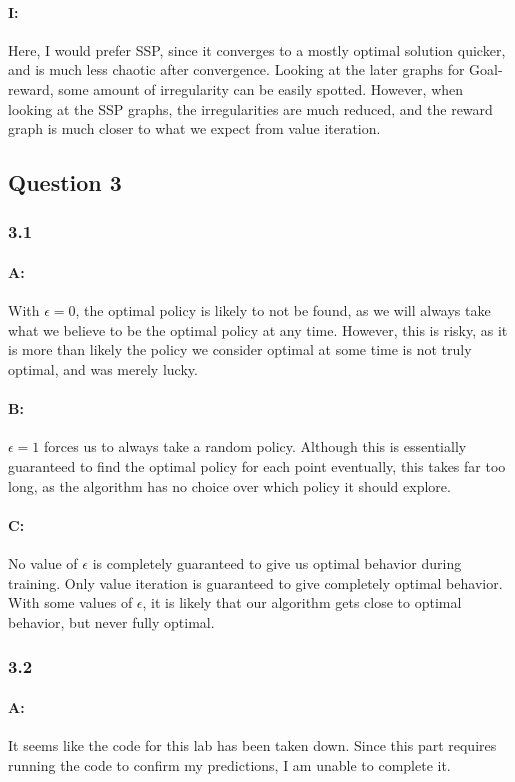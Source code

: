 \documentclass{article}
\begin{document}
\paragraph{I: } Here, I would prefer SSP, since it converges to a mostly optimal solution quicker, and is much less chaotic after convergence. Looking at the later graphs for Goal-reward, some amount of irregularity can be easily spotted. However, when looking at the SSP graphs, the irregularities are much reduced, and the reward graph is much closer to what we expect from value iteration.

\subsection{Question 3}

\subsubsection{3.1}

\paragraph{A: } With $\epsilon=0$, the optimal policy is likely to not be found, as we will always take what we believe to be the optimal policy at any time. However, this is risky, as it is more than likely the policy we consider optimal at some time is not truly optimal, and was merely lucky.

\paragraph{B: } $\epsilon=1$ forces us to always take a random policy. Although this is essentially guaranteed to find the optimal policy for each point eventually, this takes far too long, as the algorithm has no choice over which policy it should explore.

\paragraph{C: } No value of $\epsilon$ is completely guaranteed to give us optimal behavior during training. Only value iteration is guaranteed to give completely optimal behavior. With some values of $\epsilon$, it is likely that our algorithm gets close to optimal behavior, but never fully optimal.

\subsubsection{3.2}

\paragraph{A: } It seems like the code for this lab has been taken down. Since this part requires running the code to confirm my predictions, I am unable to complete it.
\end{document}
